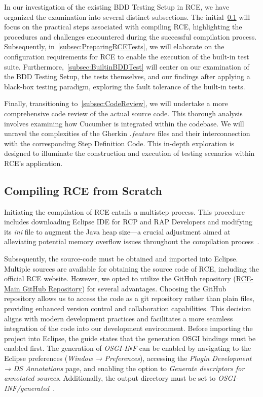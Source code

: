 
In our investigation of the existing BDD Testing Setup in \ac{RCE}, we have organized the examination into several distinct subsections. The initial~\cref{subsec:BuildingRCE} will focus on the practical steps associated with compiling \ac{RCE}, highlighting the procedures and challenges encountered during the successful compilation process. Subsequently, in~\cref{subsec:PreparingRCETests}, we will elaborate on the configuration requirements for \ac{RCE} to enable the execution of the built-in test suite. Furthermore,~\cref{subsec:BuiltinBDDTest} will center on our examination of the BDD Testing Setup, the tests themselves, and our findings after applying a black-box testing paradigm, exploring the fault tolerance of the built-in tests.

Finally, transitioning to~\cref{subsec:CodeReview}, we will undertake a more comprehensive code review of the actual source code. This thorough analysis involves examining how Cucumber is integrated within the codebase. We will unravel the complexities of the Gherkin $.feature$ files and their interconnection with the corresponding Step Definition Code. This in-depth exploration is designed to illuminate the construction and execution of testing scenarios within \ac{RCE}'s application.

\subsection{Compiling \ac{RCE} from Scratch}
\label{subsec:BuildingRCE}
Initiating the compilation of \ac{RCE} entails a multistep process. This procedure includes downloading Eclipse IDE for RCP and RAP Developers and modifying its \textit{ini} file to augment the Java heap size—a crucial adjustment aimed at alleviating potential memory overflow issues throughout the compilation process~\cite{rceDevGuide10x}.

Subsequently, the source-code must be obtained and imported into Eclipse. Multiple sources are available for obtaining the source code of \ac{RCE}, including the official RCE website. However, we opted to utilize the GitHub repository (\href{https://github.com/rcenvironment/rce-main}{RCE-Main GitHub Repository}) for several advantages. Choosing the GitHub repository allows us to access the code as a git repository rather than plain files, providing enhanced version control and collaboration capabilities. This decision aligns with modern development practices and facilitates a more seamless integration of the code into our development environment. Before importing the project into Eclipse, the guide states that the generation OSGI bindings must be enabled first. The generation of \textit{OSGI-INF} can be enabled by navigating to the Eclipse preferences (\textit{Window → Preferences}), accessing the \textit{Plugin Development → DS Annotations} page, and enabling the option to \textit{Generate descriptors for annotated sources}. Additionally, the output directory must be set to \textit{OSGI-INF/generated}~\cite{rceDevGuide10x}.

